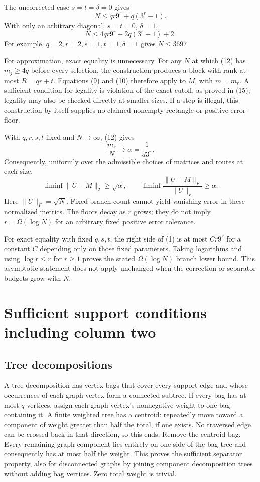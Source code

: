 \documentclass[
  11pt,
]{article}
\begin{document}
The uncorrected case \(s=t=\delta=0\) gives \[
 N\le qr9^r+q(3^r-1).                                      \tag{17}
\] With only an arbitrary diagonal, \(s=t=0\), \(\delta=1\), \[
 N\le4qr9^r+2q(3^r-1)+2.                                   \tag{18}
\] For example, \(q=2,r=2,s=1,t=1,\delta=1\) gives \(N\le3697\).

For approximation, exact equality is unnecessary. For any \(N\) at which
(12) has \(m_j\ge4q\) before every selection, the construction produces
a block with rank at most \(R=qr+t\). Equations (9) and (10) therefore
apply to \(M\), with \(m=m_r\). A sufficient condition for legality is
violation of the exact cutoff, as proved in (15); legality may also be
checked directly at smaller sizes. If a step is illegal, this
construction by itself supplies no claimed nonempty rectangle or
positive error floor.

With \(q,r,s,t\) fixed and \(N\to\infty\), (12) gives \[
 \frac{m_r}{N}\longrightarrow \alpha=\frac1{d3^r}.
\] Consequently, uniformly over the admissible choices of matrices and
routes at each size, \[
 \liminf\|U-M\|_2\ge\sqrt\alpha,\qquad
 \liminf\frac{\|U-M\|_F}{\|U\|_F}\ge\alpha.                \tag{19}
\] Here \(\|U\|_F=\sqrt N\). Fixed branch count cannot yield vanishing
error in these normalized metrics. The floors decay as \(r\) grows; they
do not imply \(r=\Omega(\log N)\) for an arbitrary fixed positive error
tolerance.

For exact equality with fixed \(q,s,t\), the right side of (1) is at
most \(C r9^r\) for a constant \(C\) depending only on those fixed
parameters. Taking logarithms and using \(\log r\le r\) for \(r\ge1\)
proves the stated \(\Omega(\log N)\) branch lower bound. This asymptotic
statement does not apply unchanged when the correction or separator
budgets grow with \(N\).

\section{Sufficient support conditions including column
two}\label{sufficient-support-conditions-including-column-two}

\subsection{Tree decompositions}\label{tree-decompositions}

A tree decomposition has vertex bags that cover every support edge and
whose occurrences of each graph vertex form a connected subtree. If
every bag has at most \(q\) vertices, assign each graph vertex's
nonnegative weight to one bag containing it. A finite weighted tree has
a centroid: repeatedly move toward a component of weight greater than
half the total, if one exists. No traversed edge can be crossed back in
that direction, so this ends. Remove the centroid bag. Every remaining
graph component lies entirely on one side of the bag tree and
consequently has at most half the weight. This proves the sufficient
separator property, also for disconnected graphs by joining component
decomposition trees without adding bag vertices. Zero total weight is
trivial.
\end{document}

